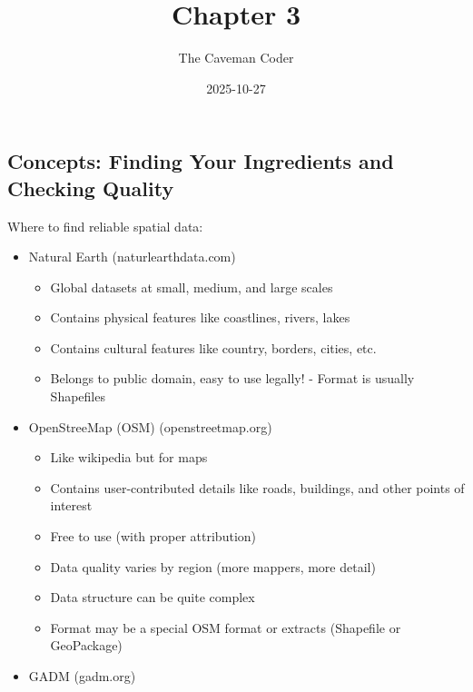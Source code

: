 \documentclass[
]{article}
\title{Chapter 3}
\author{The Caveman Coder}
\date{2025-10-27}
\providecommand{\tightlist}{%
  \setlength{\itemsep}{0pt}\setlength{\parskip}{0pt}}
\begin{document}
\maketitle

\subsection{Concepts: Finding Your Ingredients and Checking
Quality}\label{concepts-finding-your-ingredients-and-checking-quality}

Where to find reliable spatial data:

\begin{itemize}
\tightlist
\item
  Natural Earth (naturlearthdata.com)

  \begin{itemize}
  \tightlist
  \item
    Global datasets at small, medium, and large scales\\
  \item
    Contains physical features like coastlines, rivers, lakes\\
  \item
    Contains cultural features like country, borders, cities, etc.
  \item
    Belongs to public domain, easy to use legally! - Format is usually
    Shapefiles\\
  \end{itemize}
\item
  OpenStreeMap (OSM) (openstreetmap.org)

  \begin{itemize}
  \tightlist
  \item
    Like wikipedia but for maps\\
  \item
    Contains user-contributed details like roads, buildings, and other
    points of interest\\
  \item
    Free to use (with proper attribution)\\
  \item
    Data quality varies by region (more mappers, more detail)\\
  \item
    Data structure can be quite complex\\
  \item
    Format may be a special OSM format or extracts (Shapefile or
    GeoPackage)\\
  \end{itemize}
\item
  GADM (gadm.org)


\end{itemize}
\end{document}
